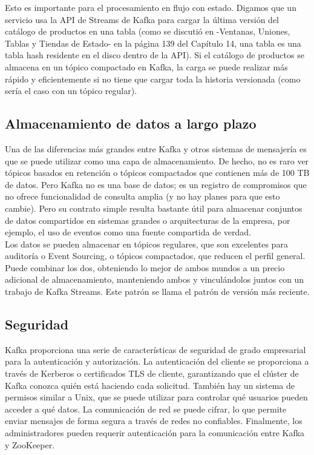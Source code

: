 \documentclass{article}
\begin{document}
Esto es importante para el procesamiento en flujo con estado. Digamos que un servicio usa la API de Streams de Kafka para cargar la última versión del catálogo de productos en una tabla (como se discutió en -Ventanas, Uniones, Tablas y Tiendas de Estado- en la página 139 del Capítulo 14, una tabla es una tabla hash residente en el disco dentro de la API). Si el catálogo de productos se almacena en un tópico compactado en Kafka, la carga se puede realizar más rápido y eficientemente si no tiene que cargar toda la historia versionada (como sería el caso con un tópico regular).

\subsection{Almacenamiento de datos a largo plazo}
Una de las diferencias más grandes entre Kafka y otros sistemas de mensajería es que
se puede utilizar como una capa de almacenamiento. De hecho, no es raro ver tópicos
basados en retención o tópicos compactados que contienen más de 100 TB de datos. Pero Kafka no es una
base de datos; es un registro de compromisos que no ofrece funcionalidad de consulta amplia (y no hay
planes para que esto cambie). Pero su contrato simple resulta bastante útil
para almacenar conjuntos de datos compartidos en sistemas grandes o arquitecturas de la empresa, por ejemplo, el uso de eventos como una fuente compartida de verdad.\\

Los datos se pueden almacenar en tópicos regulares, que son excelentes para auditoría o Event Sourcing,
o tópicos compactados, que reducen el perfil general. Puede combinar los
dos, obteniendo lo mejor de ambos mundos a un precio adicional de almacenamiento, manteniendo
ambos y vinculándolos juntos con un trabajo de Kafka Streams. Este patrón se llama
el patrón de versión más reciente.

\subsection{Seguridad}
Kafka proporciona una serie de características de seguridad de grado empresarial para la autenticación y autorización. La autenticación del cliente se proporciona a través de Kerberos o certificados TLS de cliente, garantizando que el clúster de Kafka conozca quién está haciendo cada solicitud. También hay un sistema de permisos similar a Unix, que se puede utilizar para controlar qué usuarios pueden acceder a qué datos. La comunicación de red se puede cifrar, lo que permite enviar mensajes de forma segura a través de redes no confiables. Finalmente, los administradores pueden requerir autenticación para la comunicación entre Kafka y ZooKeeper.\\
\end{document}
